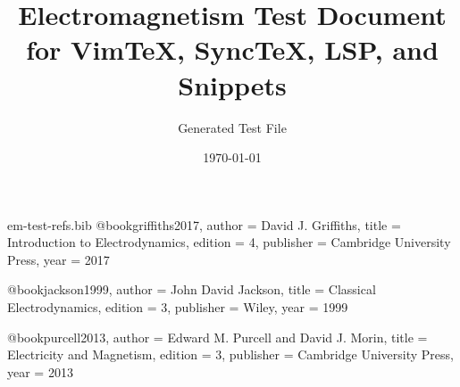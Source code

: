 \begin{filecontents*}{em-test-refs.bib}
@book{griffiths2017,
  author    = {David J. Griffiths},
  title     = {Introduction to Electrodynamics},
  edition   = {4},
  publisher = {Cambridge University Press},
  year      = {2017}
}

@book{jackson1999,
  author    = {John David Jackson},
  title     = {Classical Electrodynamics},
  edition   = {3},
  publisher = {Wiley},
  year      = {1999}
}

@book{purcell2013,
  author    = {Edward M. Purcell and David J. Morin},
  title     = {Electricity and Magnetism},
  edition   = {3},
  publisher = {Cambridge University Press},
  year      = {2013}
}
\end{filecontents*}

\documentclass[11pt,a4paper]{article}

\usepackage[a4paper,margin=1in]{geometry}
\usepackage[T1]{fontenc}
\usepackage{lmodern}
\usepackage{microtype}

\usepackage{amsmath,amssymb,mathtools}
\usepackage{bm}
\usepackage{siunitx}
\usepackage{booktabs}
\usepackage{enumitem}
\usepackage{tikz}
\usetikzlibrary{arrows.meta,calc,decorations.pathmorphing,patterns}

\usepackage[
  backend=biber,
  style=ieee,
  sorting=none
]{biblatex}


\usepackage[colorlinks=true,linkcolor=blue,citecolor=magenta,urlcolor=teal]{hyperref}
\usepackage[nameinlink,noabbrev]{cleveref}

\setlength{\parskip}{0.5em}
\setlength{\parindent}{0pt}

\newcommand{\dd}{\mathop{}\!\mathrm{d}}
\newcommand{\ee}{\mathrm{e}}
\newcommand{\ii}{\mathrm{i}}
\newcommand{\vect}[1]{\bm{#1}}
\newcommand{\E}{\vect{E}}
\newcommand{\B}{\vect{B}}
\newcommand{\D}{\vect{D}}
\newcommand{\Hfield}{\vect{H}}
\newcommand{\J}{\vect{J}}
\newcommand{\A}{\vect{A}}
\newcommand{\grad}{\vect{\nabla}}
\newcommand{\curl}{\grad \times}
\newcommand{\divergence}{\grad \cdot}
\newcommand{\epszero}{\varepsilon_0}
\newcommand{\muzero}{\mu_0}

\title{Electromagnetism Test Document for VimTeX, SyncTeX, LSP, and Snippets}
\author{Generated Test File}
\date{\today}


\maketitle

